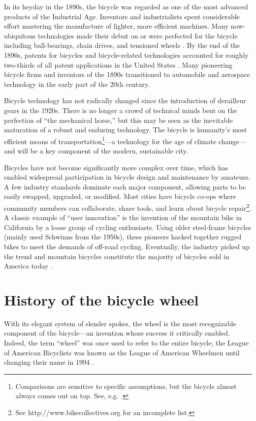 \documentclass[../thesis.tex]{subfiles}
\begin{document}
In its heyday in the 1890s, the bicycle was regarded as one of the most advanced products of the Industrial Age. Inventors and industrialists spent considerable effort mastering the manufacture of lighter, more efficient machines. Many now-ubiquitous technologies made their debut on or were perfected for the bicycle including ball-bearings, chain drives, and tensioned wheels \cite{Herlihy2004}. By the end of the 1890s, patents for bicycles and bicycle-related technologies accounted for roughly two-thirds of all patent applications in the United States \cite{Pridmore1996}. Many pioneering bicycle firms and inventors of the 1890s transitioned to automobile and aerospace technology in the early part of the 20th century.

Bicycle technology has not radically changed since the introduction of derailleur gears in the 1920s. There is no longer a crowd of technical minds bent on the perfection of ``the mechanical horse,'' but this may be seen as the inevitable maturation of a robust and enduring technology. The bicycle is humanity's most efficient means of transportation\footnote{Comparisons are sensitive to specific assumptions, but the bicycle almost always comes out on top. See, e.g. \cite{Ghanta2010}.}---a technology for the age of climate change---and will be a key component of the modern, sustainable city.

Bicycles have not become significantly more complex over time, which has enabled widespread participation in bicycle design and maintenance by amateurs. A few industry standards dominate each major component, allowing parts to be easily swapped, upgraded, or modified. Most cities have bicycle co-ops where community members can collaborate, share tools, and learn about bicycle repair\footnote{See http://www.bikecollectives.org for an incomplete list.}. A classic example of ``user innovation'' is the invention of the mountain bike in California by a loose group of cycling enthusiasts. Using older steel-frame bicycles (mainly used Schwinns from the 1950s), these pioneers hacked together rugged bikes to meet the demands of off-road cycling. Eventually, the industry picked up the trend and mountain bicycles constitute the majority of bicycles sold in America today \cite{Crown1996}.


\section{History of the bicycle wheel}

With its elegant system of slender spokes, the wheel is the most recognizable component of the bicycle---an invention whose success it critically enabled. Indeed, the term ``wheel'' was once used to refer to the entire bicycle; the League of American Bicyclists was known as the League of American Wheelmen until changing their name in 1994 \cite{Sturges}.
\end{document}

